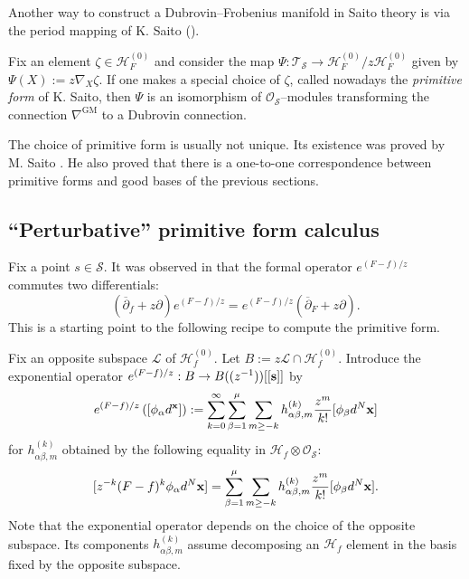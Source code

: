 \documentclass[12pt,a4paper]{amsart}
\newcommand{\calS}{{\cal S}}
\newcommand{\bx}{{\bf x}}
\def\H{{\mathcal H}}
\def\L{{\mathcal L}}
\def\O{{\mathcal O}}
\def\T{{\mathcal T}}
\renewcommand{\S}{{\mathcal S}}
\def\calS{{\mathcal S}}
\newcommand{\p}{{\partial}}
\newcommand{\<}{\left<}
\renewcommand{\>}{\right>}
\newcommand{\bs}{{\bf s}}
\newcommand{\GM}{{\mathrm{GM}}}
\numberwithin{equation}{section}
\begin{document}
Another way to construct a Dubrovin--Frobenius manifold in Saito theory is via the period mapping of K. Saito (\cite{SK3}).

Fix an element $\zeta \in \H_F^{(0)}$ and consider the map $\Psi: \T_\S \to \H_F^{(0)} / z \H_F^{(0)}$ given by $\Psi(X) := z \nabla_X \zeta$. If one makes a special choice of $\zeta$, called nowadays the \textit{primitive form} of K. Saito, then $\Psi$ is an isomorphism of $\O_\S$--modules transforming the connection $\nabla^{\GM}$ to a Dubrovin connection.

The choice of primitive form is usually not unique. Its existence was proved by M. Saito \cite{SM1,SM2}. He also proved that there is a one-to-one correspondence between primitive forms and good bases of the previous sections.


\subsection{``Perturbative'' primitive form calculus}
Fix a point $s \in \calS$. It was observed in \cite{LLS} that the formal operator $e^{(F-f)/z}$ commutes two differentials:
\[
    (\overline \p_f + z \p) e^{(F-f)/z} = e^{(F-f)/z} (\overline \p_F + z \p).
\]
This is a starting point to the following recipe to compute the primitive form.

Fix an opposite subspace $\L$ of $\H_f^{(0)}$. Let $B := z\L \cap \H_f^{(0)}$. Introduce the exponential operator $e^{(F-f)/z}: B \to B((z^{-1}))[[\bs]]$ by
\[
 e^{(F-f)/z} \left( [\phi_\alpha d^\bx] \right) := \sum_{k =0}^\infty \sum_{\beta=1}^\mu \sum_{m \ge -k} h^{(k)}_{\alpha\beta,m} \frac{z^m}{k!} [\phi_\beta d^N\bx]
\]
for $h_{\alpha\beta,m}^{(k)}$ obtained by the following equality in $\H_f \otimes \O_\S$:
\[
    [z^{-k} (F-f)^k \phi_\alpha d^N\bx] = \sum_{\beta=1}^\mu \sum_{m \ge -k} h^{(k)}_{\alpha\beta,m} \frac{z^m}{k!} [\phi_\beta d^N\bx].
\]
Note that the exponential operator depends on the choice of the opposite subspace. Its components $h^{(k)}_{\alpha\beta,m}$ assume decomposing an $\H_f$ element in the basis fixed by the opposite subspace.
\end{document}
